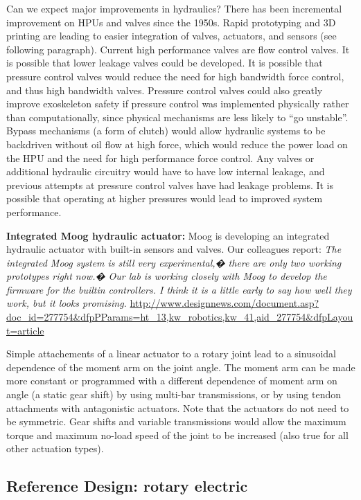 \documentclass[letterpaper,12pt,fullpage]{article}
\begin{document}
Can we expect major improvements in hydraulics?
There has been incremental improvement on HPUs and valves since
the 1950s. Rapid prototyping and 3D printing are leading to
easier integration of valves, actuators, and sensors (see following
paragraph). Current high performance valves are flow control valves. It
is possible that lower leakage valves could be developed. It is possible
that pressure control valves would reduce the need for high bandwidth
force control, and thus high bandwidth valves. Pressure control valves
could also greatly improve exoskeleton safety if pressure control was
implemented physically rather than computationally, since physical
mechanisms are less likely to ``go unstable''.
Bypass mechanisms (a form of clutch) would allow hydraulic systems
to be backdriven without oil flow at high force, which would reduce
the power load on the HPU and the need for high performance force control.
Any valves or additional hydraulic circuitry
would have to have low internal leakage, and previous attempts at
pressure control valves have had leakage problems.
It is possible that operating at higher pressures would lead to improved
system performance.

{\bf Integrated Moog hydraulic actuator:}
Moog is developing an integrated hydraulic actuator with built-in
sensors and valves. Our colleagues report:
{\it The integrated Moog system is still very experimental,� there are
only two working prototypes right now.� Our lab is working closely
with Moog to develop the firmware for the builtin controllers. I
think it is a little early to say how well they work, but it looks
promising.}
\url{http://www.designnews.com/document.asp?doc_id=277754&dfpPParams=ht_13,kw_robotics,kw_41,aid_277754&dfpLayout=article}

Simple attachements of a linear actuator to a rotary joint lead to
a sinusoidal dependence of the moment arm on the joint angle.
The moment arm can be made more constant or programmed with
a different dependence of moment arm on angle (a static gear shift)
by using multi-bar transmissions,
or by using tendon attachments with antagonistic actuators.
Note that the actuators do not need to be symmetric.
Gear shifts and variable transmissions would allow the maximum torque
and maximum no-load speed of the joint to be increased (also true
for all other actuation types).

\subsection{Reference Design: rotary electric}
\end{document}
